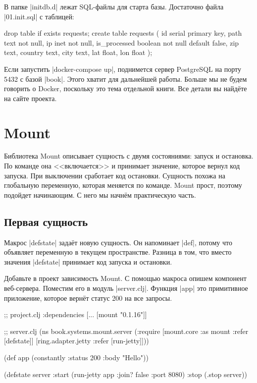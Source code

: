 В папке \spverb|initdb.d| лежат SQL-файлы для старта базы. Достаточно файла
\spverb|01.init.sql| с таблицей:

\begin{english}
  \begin{sql}
drop table if exists requests;
create table requests (
    id            serial primary key,
    path          text not null,
    ip            inet not null,
    is_processed  boolean not null default false,
    zip           text,
    country       text,
    city          text,
    lat           float,
    lon           float
);
  \end{sql}
\end{english}

Если запустить \spverb|docker-compose up|, поднимется сервер PostgreSQL на порту
5432 с базой \spverb|book|. Этого хватит для дальнейшей работы. Больше мы не
будем говорить о Docker, поскольку это тема отдельной книги. Все детали вы
найд\"{е}те на сайте проекта.

\section{Mount}

Библиотека Mount описывает сущность с
двумя состояниями: запуск и остановка. По команде она <<включается>> и принимает
значение, которое вернул код запуска. При выключении сработает код
остановки. Сущность похожа на глобальную переменную, которая меняется по
команде. Mount прост, поэтому подойдет начинающим. С него мы начн\"{е}м
практическую часть.

\subsection{Первая сущность}

Макрос \spverb|defstate| зада\"{е}т новую сущность. Он напоминает \spverb|def|,
потому что объявляет переменную в текущем пространстве. Разница в том, что
вместо значения \spverb|defstate| принимает код запуска и остановки.

Добавьте в проект зависимость Mount. С помощью макроса опишем компонент
веб-сервера. Поместим его в модуль \spverb|server.clj|. Функция \spverb|app| это
примитивное приложение, которое верн\"{е}т статус 200 на все запросы.

\begin{english}
  \begin{clojure}
;; project.clj
:dependencies [... [mount "0.1.16"]]

;; server.clj
(ns book.systems.mount.server
  (:require
   [mount.core :as mount :refer [defstate]]
   [ring.adapter.jetty :refer [run-jetty]]))

(def app (constantly {:status 200 :body "Hello"}))

(defstate server
  :start (run-jetty app {:join? false :port 8080})
  :stop (.stop server))
  \end{clojure}
\end{english}

